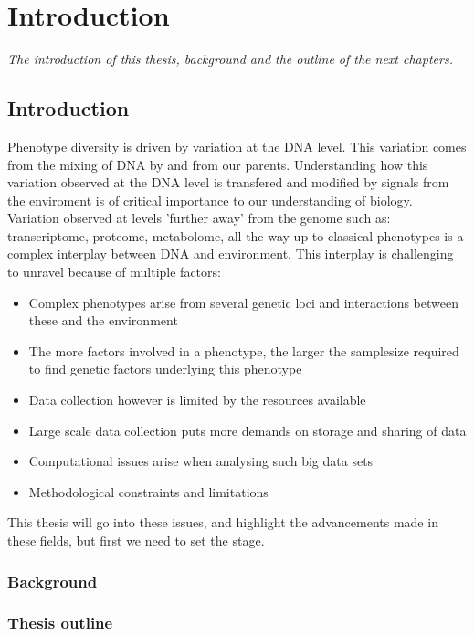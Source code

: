 \chapter{Introduction}
\emph{The introduction of this thesis, background and the outline of the next chapters.}

\null
\vfill
\newpage

\section{Introduction}

Phenotype diversity is driven by variation at the DNA level. This variation comes from the mixing of 
DNA by and from our parents. Understanding how this variation observed at the DNA level is transfered 
and modified by signals from the enviroment is of critical importance to our understanding of 
biology. Variation observed at levels 'further away' from the genome such as: transcriptome, proteome, 
metabolome, all the way up to classical phenotypes is a complex interplay between DNA and 
environment. This interplay is challenging to unravel because of multiple factors:\\
\begin{itemize}
\item Complex phenotypes arise from several genetic loci and interactions between these and the 
environment
\item The more factors involved in a phenotype, the larger the samplesize required to find genetic 
factors underlying this phenotype
\item Data collection however is limited by the resources available
\item Large scale data collection puts more demands on storage and sharing of data
\item Computational issues arise when analysing such big data sets
\item Methodological constraints and limitations
\end{itemize}

This thesis will go into these issues, and highlight the advancements made in these 
fields, but first we need to set the stage.

\subsection{Background}


\subsection{Thesis outline}

